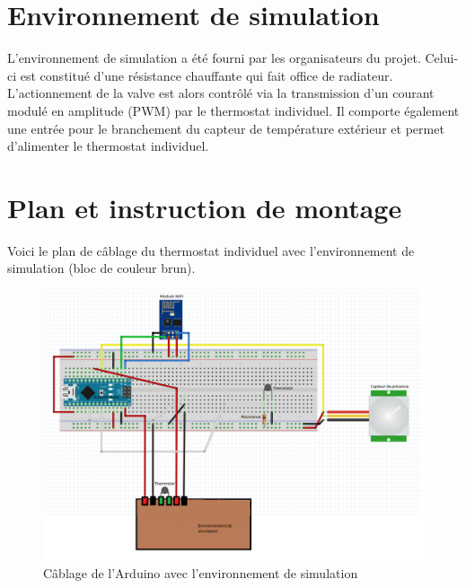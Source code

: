 \documentclass[12pt]{report}
\begin{document}
\section{Environnement de simulation}
L'environnement de simulation a été fourni par les organisateurs du projet. Celui-ci est constitué d'une résistance chauffante qui fait office de radiateur. L'actionnement de la valve est alors contrôlé via la transmission d'un courant modulé en amplitude (PWM) \cite{PWM} par le thermostat individuel. Il comporte également une entrée pour le branchement du capteur de température extérieur et permet d'alimenter le thermostat individuel. \\

\section{Plan et instruction de montage}
Voici le plan de câblage du thermostat individuel avec l'environnement de simulation (bloc de couleur brun).  
\begin{figure}[H]
\begin{center}
\includegraphics[scale=0.4]{cablage.PNG}
\caption{\label{cablage} Câblage de l'Arduino avec l'environnement de simulation}
\end{center}
\end{figure}

\end{document}
